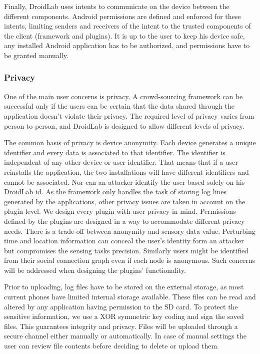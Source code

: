 \documentclass[conference,letterpaper]{IEEEtran}
\begin{document}
Finally, DroidLab uses intents to communicate on the device between the different components. Android permissions are defined and enforced for these intents, limiting senders and receivers of the intent to the trusted components of the client (framework and plugins). It is up to the user to keep his device safe, any installed Android application has to be authorized, and permissions have to be granted manually.


\subsubsection{Privacy}

One of the main user concerns is privacy. A crowd-sourcing framework can be successful only if the users can be certain that the data shared through the application doesn't violate their privacy. The required level of privacy varies from person to person, and DroidLab is designed to allow different levels of privacy.

The common basis of privacy is device anonymity. Each device generates a unique identifier and every data is associated to that identifier. The identifier is independent of any other device or user identifier. That means that if a user reinstalls the application, the two installations will have different identifiers and cannot be associated. Nor can an attacker identify the user based solely on his DroidLab id. As the framework only handles the task of storing log lines generated by the applications, other privacy issues are taken in account on the plugin level. We design every plugin with user privacy in mind. Permissions defined by the plugins are designed in a way to accommodate different privacy needs. There is a trade-off between anonymity and sensory data value. Perturbing time and location information can conceal the user's identity form an attacker but compromises the sensing tasks precision. Similarly users might be identified from their social connection graph even if each node is anonymous. Such concerns will be addressed when designing the plugins' functionality.

Prior to uploading, log files have to be stored on the external storage, as most current phones have limited internal storage available. These files can be read and altered by any application having permission to the SD card. To protect the sensitive information, we use a XOR symmetric key coding and sign the saved files. This guarantees integrity and privacy. Files will be uploaded through a secure channel either manually or automatically. In case of manual settings the user can review file contents before deciding to delete or upload them.
\end{document}
